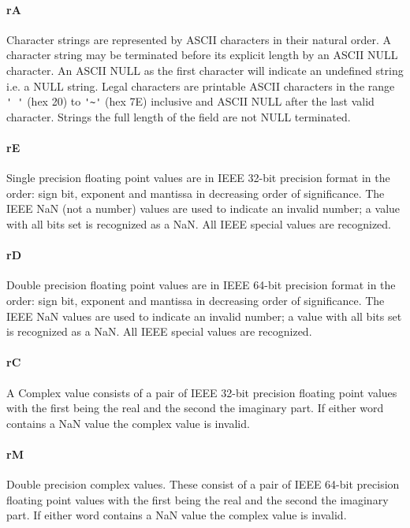 \paragraph{rA} Character strings are represented by ASCII characters
in their natural order.  
A character string may  be terminated before its
explicit length by an ASCII NULL character. An ASCII NULL as the first
character will indicate an undefined string i.e. a NULL string. Legal
characters are printable ASCII characters in the range \verb|' '| 
(hex 20) to \verb|'~'| (hex 7E) inclusive and ASCII NULL after the
last valid character.  Strings the full length of the field are not
NULL terminated. 

\paragraph{rE} Single precision floating point
values are in IEEE 32-bit
precision format in the order: sign bit, exponent and mantissa in
decreasing order of significance. The IEEE NaN (not a number) values
are used to indicate an invalid number; 
a value with all bits set is
recognized as a NaN. All IEEE special
values are recognized.

\paragraph{rD}  Double precision floating point values are in IEEE 64-bit
precision format in the order: sign bit, exponent and mantissa in
decreasing order of significance.  The IEEE NaN values are used to
indicate an invalid number; a value with  all bits set is recognized
as a NaN. All IEEE special values are recognized. 

\paragraph{rC}  A Complex value
consists of a pair of IEEE 32-bit
precision floating point values with the first being the real and the
second the imaginary part.  If either word contains a NaN value the
complex value is invalid.

\paragraph{rM} Double precision complex values.  These consist of a
pair of IEEE 64-bit precision floating point values with the first
being the real and the second the imaginary part.  If either word
contains a NaN value the complex value is invalid.

